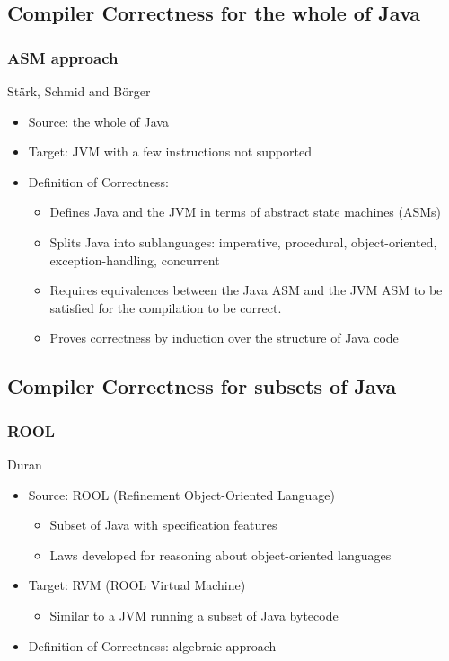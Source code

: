 \documentclass{beamer}
\newcommand{\footmake}[1]{
\ifthenelse{\equal{#1}{}}%
	{}%
	{\footnotetext{#1}}%
}
\newenvironment{slide}[2][fragile,environment=slide]
{\begin{frame}[#1]
	\frametitle{#2}\begin{refsegment}}
{\footmake{\printbibliography[segment=\therefsegment]}\end{refsegment}\end{frame}}
\begin{document}
\subsection{Compiler Correctness for the whole of Java}

\begin{slide}{ASM approach}
  St\"{a}rk, Schmid and B\"orger\cite{stark2001}
  \begin{itemize}
  \item Source: the whole of Java
  \item Target: JVM with a few instructions not supported
  \item Definition of Correctness:
    \begin{itemize}
    \item Defines Java and the JVM in terms of abstract state machines (ASMs)
    \item Splits Java into sublanguages: imperative, procedural, object-oriented, exception-handling, concurrent
    \item Requires equivalences between the Java ASM and the JVM ASM to be satisfied for the compilation to be correct.
    \item Proves correctness by induction over the structure of Java code
    \end{itemize}
  \end{itemize}
\end{slide}

\subsection{Compiler Correctness for subsets of Java}

\begin{slide}{ROOL}
  Duran\cite{duran2005, duran2010}
  \begin{itemize}
  \item Source: ROOL (Refinement Object-Oriented Language)\cite{cavalcanti2000}
    \begin{itemize}
    \item Subset of Java with specification features
    \item Laws developed for reasoning about object-oriented languages\cite{borba2000}
    \end{itemize}
  \item Target: RVM (ROOL Virtual Machine)
    \begin{itemize}
    \item Similar to a JVM running a subset of Java bytecode
    \end{itemize}
  \item Definition of Correctness: algebraic approach
  \end{itemize}
\end{slide}
\end{document}
